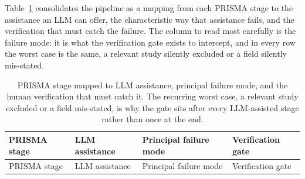 \documentclass[
  letterpaper,
  11pt]{scrbook}
\begin{document}
Table~\ref{tbl-prisma-mapping} consolidates the pipeline as a mapping
from each PRISMA stage to the assistance an LLM can offer, the
characteristic way that assistance fails, and the verification that must
catch the failure. The column to read most carefully is the failure
mode: it is what the verification gate exists to intercept, and in every
row the worst case is the same, a relevant study silently excluded or a
field silently mis-stated.

\begin{longtable}[]{@{}
  >{\raggedright\arraybackslash}p{}
  >{\raggedright\arraybackslash}p{}
  >{\raggedright\arraybackslash}p{}
  >{\raggedright\arraybackslash}p{}@{}}
\caption{PRISMA stage mapped to LLM assistance, principal failure mode,
and the human verification that must catch it. The recurring worst case,
a relevant study excluded or a field mis-stated, is why the gate sits
after every LLM-assisted stage rather than once at the
end.}\label{tbl-prisma-mapping}\tabularnewline
\toprule\noalign{}
\begin{minipage}[b]{\linewidth}\raggedright
PRISMA stage
\end{minipage} & \begin{minipage}[b]{\linewidth}\raggedright
LLM assistance
\end{minipage} & \begin{minipage}[b]{\linewidth}\raggedright
Principal failure mode
\end{minipage} & \begin{minipage}[b]{\linewidth}\raggedright
Verification gate
\end{minipage} \\
\midrule\noalign{}
\endfirsthead
\toprule\noalign{}
\begin{minipage}[b]{\linewidth}\raggedright
PRISMA stage
\end{minipage} & \begin{minipage}[b]{\linewidth}\raggedright
LLM assistance
\end{minipage} & \begin{minipage}[b]{\linewidth}\raggedright
Principal failure mode
\end{minipage} & \begin{minipage}[b]{\linewidth}\raggedright
Verification gate
\end{minipage} \\

\end{longtable}
\end{document}

